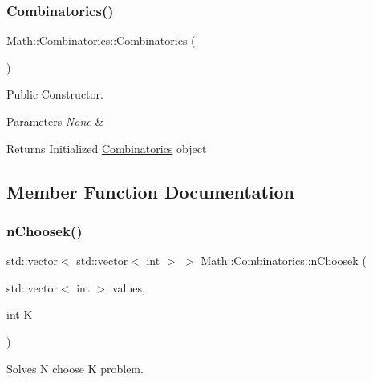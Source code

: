 \subsubsection{\texorpdfstring{Combinatorics()}{Combinatorics()}}
{\footnotesize\ttfamily Math\+::\+Combinatorics\+::\+Combinatorics (\begin{DoxyParamCaption}{ }\end{DoxyParamCaption})\hspace{0.3cm}{\ttfamily [inline]}}



Public Constructor. 


\begin{DoxyParams}{Parameters}
{\em None} & \\
\hline
\end{DoxyParams}
\begin{DoxyReturn}{Returns}
Initialized \mbox{\hyperlink{class_math_1_1_combinatorics}{Combinatorics}} object 
\end{DoxyReturn}


\subsection{Member Function Documentation}
\mbox{\label{class_math_1_1_combinatorics_af5de2305b6a51f21bc920a1bc07a9163}} 
\subsubsection{\texorpdfstring{n\+Choosek()}{nChoosek()}}
{\footnotesize\ttfamily std\+::vector$<$ std\+::vector$<$ int $>$ $>$ Math\+::\+Combinatorics\+::n\+Choosek (\begin{DoxyParamCaption}\item[{std\+::vector$<$ int $>$}]{values,  }\item[{int}]{K }\end{DoxyParamCaption})}



Solves N choose K problem. 

